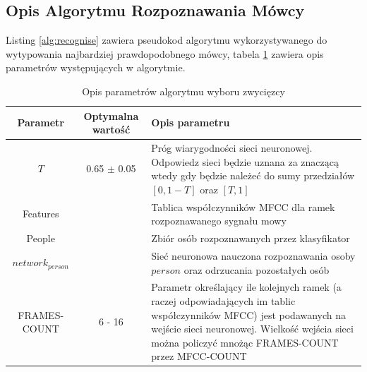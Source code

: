 \documentclass[a4paper]{article}
\begin{document}
	\clearpage
	\subsection{Opis Algorytmu Rozpoznawania Mówcy}
	
		Listing \ref{alg:recognise} zawiera pseudokod algorytmu wykorzystywanego 
		do wytypowania najbardziej prawdopodobnego mówcy, tabela \ref{tab:srparams}
		zawiera opis parametrów występujących w algorytmie.
		\begin{table}[h]
			\centering
			\begin{tabular}{|c|c|p{6cm}|}
				\hline
				Parametr & Optymalna wartość & Opis parametru \\
				\hline \hline
				$T$ & 0.65 $\pm$ 0.05 & Próg wiarygodności sieci neuronowej. Odpowiedz sieci będzie
				uznana za znaczącą wtedy gdy będzie należeć do sumy przedziałów $[0, 1-T]$ oraz
				$[T, 1]$ \\
				\hline
				Features &  & Tablica współczynników MFCC dla ramek rozpoznawanego sygnału mowy \\
				\hline
				People & & Zbiór osób rozpoznawanych przez klasyfikator \\
				\hline
				$network_{person}$ & & Sieć neuronowa nauczona rozpoznawania osoby $person$ oraz 
				odrzucania pozostałych osób \\
				\hline
				FRAMES-COUNT & 6 - 16 & Parametr określający ile kolejnych ramek 
				(a raczej odpowiadających im tablic
				współczynników MFCC) jest podawanych na wejście sieci neuronowej. Wielkość wejścia sieci
				można policzyć mnożąc FRAMES-COUNT przez MFCC-COUNT \\
				\hline
			\end{tabular}			
			\caption{Opis parametrów algorytmu wyboru zwycięzcy}
			\label{tab:srparams}
		\end{table}		
\end{document}
